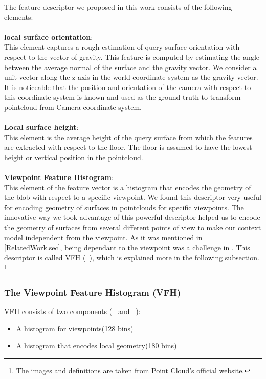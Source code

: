 The feature descriptor we proposed in this work consists of the following elements:\\
\\
{\bf local surface orientation}:\\
This element captures a rough estimation of query surface orientation with respect to the vector of gravity. This feature is computed by estimating the angle between the average normal of the surface and the gravity vector. We consider a unit vector along the z-axis in the world coordinate system as the gravity vector. It is noticeable that the position and orientation of the camera with respect to this coordinate system is known and used as
the ground truth to transform pointcloud from Camera coordinate system.\\
\\
{\bf Local surface height}:\\
This element is the average height of the query surface from which the features are extracted with respect to the floor. The floor is assumed to have the lowest height or vertical position in the pointcloud.\\
\\
{\bf Viewpoint Feature Histogram}:\\
This element of the feature vector is a histogram that encodes the geometry of the blob with respect to a specific viewpoint. We found this descriptor very useful for encoding geometry of surfaces in pointclouds for specific viewpoints. The innovative way we took advantage of this powerful descriptor helped us to encode the geometry of surfaces from several different points of view to make our context model independent from the viewpoint. As it was mentioned in \ref{RelatedWork.sec}, being dependant to the viewpoint was a challenge in \cite{aydemir2012_3Dcontext}.
This descriptor is called VFH (~\cite{5651280}), which is explained more in the following subsection. \footnote{The images and definitions are taken from Point Cloud's official website.}

\subsubsection*{The Viewpoint Feature Histogram (VFH)}
\label{VFH.ssec}
 

VFH consists of two components (~\cite{VFH_Definition} and ~\cite{5651280}):


\begin{itemize}
 \item A histogram for viewpoints(128 bins)
 \item A histogram that encodes local geometry(180 bins)
\end{itemize}

